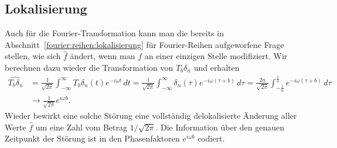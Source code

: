 \subsection{Lokalisierung
\label{fourier:integral:lokalisierung}}
Auch für die Fourier-Transformation kann man die bereits in
Abschnitt~\ref{fourier:reihen:lokalisierung} für Fourier-Reihen
aufgeworfene Frage stellen, wie sich $\hat{f}$ ändert, wenn man $f$
an einer einzigen Stelle modifiziert.
Wir berechnen dazu wieder die Transformation von $T_b\delta_n$ und
erhalten
\begin{align*}
\widehat{T_b\delta_n}
&=
\frac{1}{\sqrt{2\pi}}
\int_{-\infty}^{\infty}
T_b\delta_n(t) e^{-i\omega t}\,dt
=
\frac{1}{\sqrt{2\pi}}
\int_{-\infty}^{\infty}
\delta_n(\tau) e^{-i\omega (\tau+b)}\,d\tau
=
\frac{2n}{\sqrt{2\pi}}
\int_{-\frac1n}^{\frac1n}
e^{-i\omega (\tau+b)}\,d\tau
\\
&\to
\frac{1}{\sqrt{2\pi}}
e^{i\omega b}.
\end{align*}
Wieder bewirkt eine solche Störung eine vollständig delokalisierte
Änderung aller Werte $\hat{f}$ um eine Zahl vom Betrag $1/\sqrt{2\pi}$.
Die Information über den genauen Zeitpunkt der Störung ist in den
Phasenfaktoren $e^{i\omega b}$ codiert.



